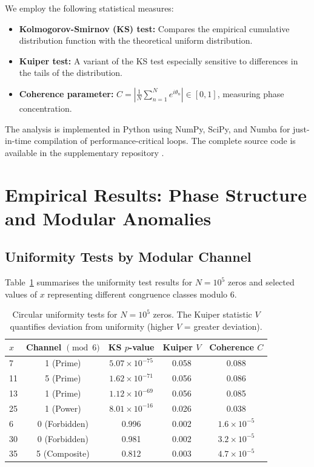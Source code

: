 \documentclass[12pt,a4paper]{article}
\theoremstyle{plain}
\theoremstyle{definition}
\theoremstyle{remark}
\begin{document}
We employ the following statistical measures:
\begin{itemize}
    \item \textbf{Kolmogorov-Smirnov (KS) test:} Compares the empirical cumulative distribution function with the theoretical uniform distribution.
    \item \textbf{Kuiper test:} A variant of the KS test especially sensitive to differences in the tails of the distribution.
    \item \textbf{Coherence parameter:} \(C = \left| \frac{1}{N} \sum_{n=1}^N e^{i\theta_n} \right| \in [0,1]\), measuring phase concentration.
\end{itemize}

The analysis is implemented in Python using NumPy, SciPy, and Numba for just-in-time compilation of performance-critical loops. The complete source code is available in the supplementary repository \cite{repo}.

\section{Empirical Results: Phase Structure and Modular Anomalies}
\label{sec:results}

\subsection{Uniformity Tests by Modular Channel}
Table~\ref{tab:uniformity} summarises the uniformity test results for \(N=10^5\) zeros and selected values of \(x\) representing different congruence classes modulo 6.

\begin{table}[H]
\centering
\caption{Circular uniformity tests for \(N=10^5\) zeros. The Kuiper statistic \(V\) quantifies deviation from uniformity (higher \(V\) = greater deviation).}
\label{tab:uniformity}
\begin{tabular}{@{}lcccc@{}}
\toprule
\(x\) & Channel \(\pmod{6}\) & KS \(p\)-value & Kuiper \(V\) & Coherence \(C\) \\
\midrule
7  & 1 (Prime)    & \(5.07 \times 10^{-75}\) & 0.058 & 0.088 \\
11 & 5 (Prime)    & \(1.62 \times 10^{-71}\) & 0.056 & 0.086 \\
13 & 1 (Prime)    & \(1.12 \times 10^{-69}\) & 0.056 & 0.085 \\
25 & 1 (Power)    & \(8.01 \times 10^{-16}\) & 0.026 & 0.038 \\
6  & 0 (Forbidden) & 0.996 & 0.002 & \(1.6 \times 10^{-5}\) \\
30 & 0 (Forbidden) & 0.981 & 0.002 & \(3.2 \times 10^{-5}\) \\
35 & 5 (Composite) & 0.812 & 0.003 & \(4.7 \times 10^{-5}\) \\
\bottomrule
\end{tabular}
\end{table}
\end{document}
